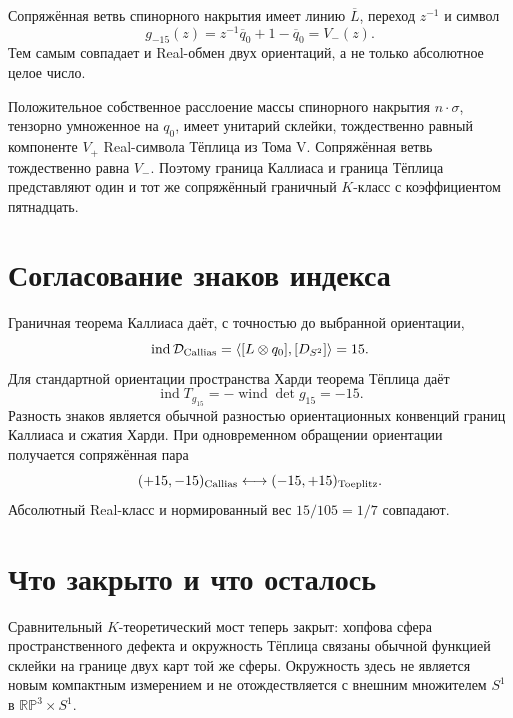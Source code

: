 Сопряжённая ветвь спинорного накрытия имеет линию $\overline L$, переход
$z^{-1}$ и символ
\begin{equation}
 g_{-15}(z)=z^{-1}\overline q_0+1-\overline q_0=V_-(z).
\end{equation}
Тем самым совпадает и Real-обмен двух ориентаций, а не только абсолютное
целое число.

\begin{theorem}
Положительное собственное расслоение массы спинорного накрытия
$n\cdot\sigma$, тензорно умноженное на $q_0$, имеет унитарий склейки,
тождественно равный компоненте $V_+$ Real-символа Тёплица из Тома V.
Сопряжённая ветвь тождественно равна $V_-$. Поэтому граница Каллиаса и
граница Тёплица представляют один и тот же сопряжённый граничный
$K$-класс с коэффициентом пятнадцать.
\end{theorem}

\section{Согласование знаков индекса}

Граничная теорема Каллиаса даёт, с точностью до выбранной ориентации,
\begin{equation}
 \operatorname{ind}\mathcal D_{\rm Callias}
 =\left\langle [L\otimes q_0],[D_{S^2}]\right\rangle
 =15.
\end{equation}
Для стандартной ориентации пространства Харди теорема Тёплица даёт
\begin{equation}
 \operatorname{ind}T_{g_{15}}
 =-\operatorname{wind}\det g_{15}=-15.
\end{equation}
Разность знаков является обычной разностью ориентационных конвенций
границ Каллиаса и сжатия Харди. При одновременном обращении
ориентации получается сопряжённая пара
\begin{equation}
 (+15,-15)_{\rm Callias}
 \longleftrightarrow
 (-15,+15)_{\rm Toeplitz}.
\end{equation}
Абсолютный Real-класс и нормированный вес $15/105=1/7$ совпадают.

\section{Что закрыто и что осталось}

Сравнительный $K$-теоретический мост теперь закрыт: хопфова сфера
пространственного дефекта и окружность Тёплица связаны обычной функцией
склейки на границе двух карт той же сферы. Окружность здесь не является новым
компактным измерением и не отождествляется с внешним множителем $S^1$ в
$\mathbb{RP}^3\times S^1$.

